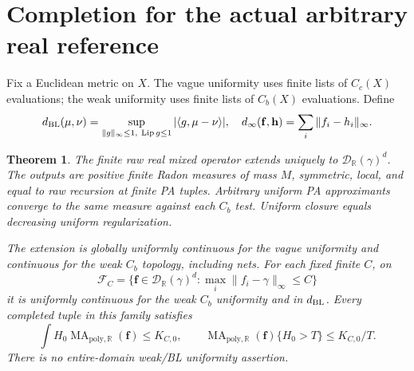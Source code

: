 \documentclass[11pt]{article}
\newtheorem{theorem}{Theorem}
\newcommand{\R}{\mathbb R}
\newcommand{\MA}{\operatorname{MA}_{\mathrm{poly},\R}}
\begin{document}
\section{Completion for the actual arbitrary real reference}
Fix a Euclidean metric on $X$. The vague uniformity uses finite lists
of $C_c(X)$ evaluations; the weak uniformity uses finite lists of
$C_b(X)$ evaluations. Define
\[
 d_{\rm BL}(\mu,\nu)=\sup_{\|g\|_\infty\leq1,\ \operatorname{Lip}g\leq1}
                         |\langle g,\mu-\nu\rangle|,
 \quad d_\infty(\mathbf f,\mathbf h)=\sum_i\|f_i-h_i\|_\infty.
\]

\begin{theorem}\label{completion}
The finite raw real mixed operator extends uniquely to
$\mathcal D_\R(\gamma)^d$. The outputs are positive finite Radon
measures of mass $M$, symmetric, local, and equal to raw recursion
at finite PA tuples. Arbitrary uniform PA approximants converge to
the same measure against each $C_b$ test. Uniform closure equals
decreasing uniform regularization.

The extension is globally uniformly continuous for the vague
uniformity and continuous for the weak $C_b$ topology, including
nets. For \emph{each fixed} finite $C$, on
\[
 \mathcal F_C=\{\mathbf f\in\mathcal D_\R(\gamma)^d:
                       \max_i\|f_i-\gamma\|_\infty\leq C\}
\]
it is uniformly continuous for the weak $C_b$ uniformity and in
$d_{\rm BL}$. \emph{Every} completed tuple in this family satisfies
\[
 \int H_0\MA(\mathbf f)\leq K_{C,0},\qquad
 \MA(\mathbf f)\{H_0>T\}\leq K_{C,0}/T.
\]
There is no entire-domain weak/BL uniformity assertion.
\end{theorem}
\end{document}

